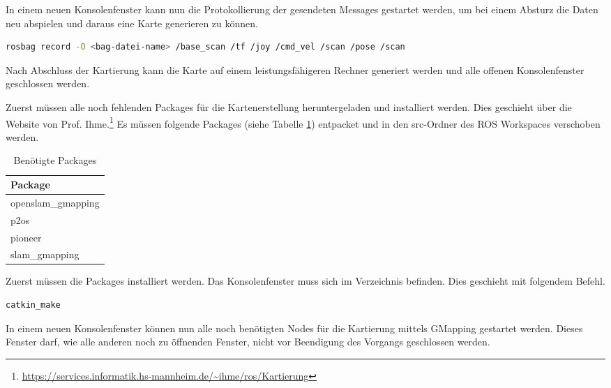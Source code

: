 In einem neuen Konsolenfenster kann nun die Protokollierung der gesendeten Messages gestartet werden, um bei einem Absturz die Daten neu abspielen und daraus eine Karte generieren zu können.

\begin{lstlisting}[language=sh,caption=Aufnahme aller versendeten Nachrichten]
    rosbag record -O <bag-datei-name> /base_scan /tf /joy /cmd_vel /scan /pose /scan
\end{lstlisting}

Nach Abschluss der Kartierung kann die Karte auf einem leistungsfähigeren Rechner generiert werden und alle offenen Konsolenfenster geschlossen werden.\par

Zuerst müssen alle noch fehlenden Packages für die Kartenerstellung heruntergeladen und installiert werden. Dies geschieht über die Website von Prof. Ihme.\footnote{\url{https://services.informatik.hs-mannheim.de/~ihme/ros/Kartierung}} Es müssen folgende Packages (siehe Tabelle \ref{tab:mapping-packages}) entpacket und in den src-Ordner des \ac{ROS} Workspaces verschoben werden.

\begin{table}[H]
  \caption{Benötigte Packages}
  \label{tab:mapping-packages}
  \renewcommand{\arraystretch}{1.2}
  \centering
  \sffamily
  \begin{footnotesize}
    \begin{tabular}{l}
    \toprule
    \textbf{Package}\\
    \midrule
    openslam{\_}gmapping\\
    p2os\\
    pioneer\\
    slam{\_}gmapping\\
    \bottomrule
    \end{tabular}
  \end{footnotesize}
  \rmfamily
\end{table}

Zuerst müssen die Packages installiert werden. Das Konsolenfenster muss sich im Verzeichnis  befinden. Dies geschieht mit folgendem Befehl.

\begin{lstlisting}[language=sh,caption=Installation fehlender Packages]
    catkin_make
\end{lstlisting}

In einem neuen Konsolenfenster können nun alle noch benötigten Nodes für die Kartierung mittels GMapping gestartet werden. Dieses Fenster darf, wie alle anderen noch zu öffnenden Fenster, nicht vor Beendigung des Vorgangs geschlossen werden.

